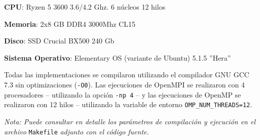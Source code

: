 \documentclass[a4paper,12pt]{article}
\begin{document}
\begin{description}
    \item \textbf{CPU}: Ryzen 5 3600 3.6/4.2 Ghz. 6 núcleos 12 hilos
    \item \textbf{Memoria}: 2x8 GB DDR4 3000Mhz CL15
    \item \textbf{Disco}: SSD Crucial BX500 240 Gb
    \item \textbf{Sistema Operativo}: Elementary OS (variante de Ubuntu) 5.1.5 ''Hera''
\end{description}

Todas las implementaciones se compilaron utilizando el compilador GNU GCC 7.3 sin optimizaciones (\verb|-O0|). Las ejecuciones de OpenMPI se realizaron con 4 procesadores -- utilizando la opción \verb|-np 4| -- y las ejecuciones de OpenMP se realizaron con 12 hilos -- utilizando la variable de entorno \verb|OMP_NUM_THREADS=12|.

\emph{Nota: Puede consultar en detalle los parámetros de compilación y ejecución en el archivo} \verb|Makefile| \emph{adjunto con el código fuente.}

\begingroup
\setlength{\tabcolsep}{12pt} %
\renewcommand{\arraystretch}{1.5} %
\end{document}
